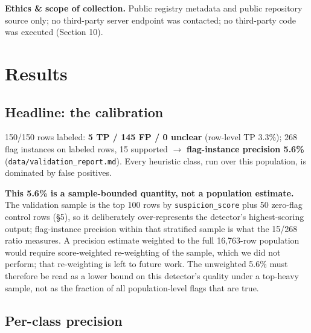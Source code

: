 \documentclass[10pt,conference]{IEEEtran}
\begin{document}
\textbf{Ethics \& scope of collection.} Public registry metadata and public repository
source only; no third-party server endpoint was contacted; no third-party code was executed
(Section 10).

\section{Results}

\subsection{Headline: the calibration}

150/150 rows labeled: \textbf{5 TP / 145 FP / 0 unclear} (row-level TP 3.3\%); 268 flag
instances on labeled rows, 15 supported $\rightarrow$ \textbf{flag-instance precision
5.6\%} (\texttt{data/validation\_report.md}). Every heuristic class, run over this
population, is dominated by false positives.

\textbf{This 5.6\% is a sample-bounded quantity, not a population estimate.} The
validation sample is the top 100 rows by \texttt{suspicion\_score} plus 50 zero-flag
control rows (\S5), so it deliberately over-represents the detector's highest-scoring
output; flag-instance precision within that stratified sample is what the 15/268 ratio
measures. A precision estimate weighted to the full 16,763-row population would require
score-weighted re-weighting of the sample, which we did not perform; that re-weighting is
left to future work. The unweighted 5.6\% must therefore be read as a lower bound on this
detector's quality under a top-heavy sample, not as the fraction of all population-level
flags that are true.

\subsection{Per-class precision}
\end{document}
